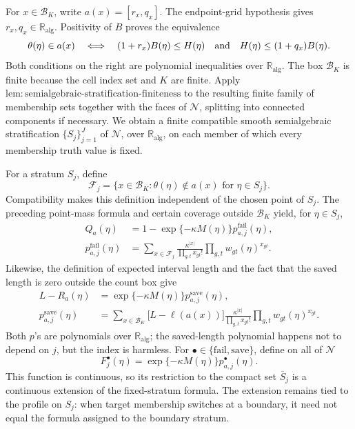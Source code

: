 For \(x\in\mathcal B_K\), write \(a(x)=[r_x,q_x]\).  The endpoint-grid hypothesis gives \(r_x,q_x\in\mathbb R_{\mathrm{alg}}\).  Positivity of \(B\) proves the equivalence
\[
 \theta(\eta)\in a(x)
 \quad\Longleftrightarrow\quad
 (1+r_x)B(\eta)\le H(\eta)
 \quad\hbox{and}\quad
 H(\eta)\le(1+q_x)B(\eta).
\]
Both conditions on the right are polynomial inequalities over \(\mathbb R_{\mathrm{alg}}\).  The box \(\mathcal B_K\) is finite because the cell index set and \(K\) are finite.  Apply \(\mathrm{lem{:}semialgebraic\text{-}stratification\text{-}finiteness}\) to the resulting finite family of membership sets together with the faces of \(\mathcal N\), splitting into connected components if necessary.  We obtain a finite compatible smooth semialgebraic stratification \(\{S_j\}_{j=1}^J\) of \(\mathcal N\), over \(\mathbb R_{\mathrm{alg}}\), on each member of which every membership truth value is fixed.

For a stratum \(S_j\), define
\[
 \mathcal F_j=\{x\in\mathcal B_K:
       \theta(\eta)\notin a(x)\text{ for }\eta\in S_j\}.
\]
Compatibility makes this definition independent of the chosen point of \(S_j\).  The preceding point-mass formula and certain coverage outside \(\mathcal B_K\) yield, for \(\eta\in S_j\),
\[
\begin{aligned}
Q_a(\eta)
 &=1-\exp\{-\kappa M(\eta)\}p^{\mathrm{fail}}_{a,j}(\eta),\\
p^{\mathrm{fail}}_{a,j}(\eta)
 &=\sum_{x\in\mathcal F_j}
   \frac{\kappa^{|x|}}{\prod_{g,t}x_{gt}!}
   \prod_{g,t}w_{gt}(\eta)^{x_{gt}}.
\end{aligned}
\]
Likewise, the definition of expected interval length and the fact that the saved length is zero outside the count box give
\[
\begin{aligned}
L-R_a(\eta)
 &=\exp\{-\kappa M(\eta)\}p^{\mathrm{save}}_{a,j}(\eta),\\
p^{\mathrm{save}}_{a,j}(\eta)
 &=\sum_{x\in\mathcal B_K}
   \bigl[L-\ell(a(x))\bigr]
   \frac{\kappa^{|x|}}{\prod_{g,t}x_{gt}!}
   \prod_{g,t}w_{gt}(\eta)^{x_{gt}}.
\end{aligned}
\]
Both \(p\)'s are polynomials over \(\mathbb R_{\mathrm{alg}}\); the saved-length polynomial happens not to depend on \(j\), but the index is harmless.  For \(\bullet\in\{\mathrm{fail},\mathrm{save}\}\), define on all of \(\mathcal N\)
\[
 F_j^{\bullet}(\eta)
 =\exp\{-\kappa M(\eta)\}p^{\bullet}_{a,j}(\eta).
\]
This function is continuous, so its restriction to the compact set \(\overline S_j\) is a continuous extension of the fixed-stratum formula.  The extension remains tied to the profile on \(S_j\): when target membership switches at a boundary, it need not equal the formula assigned to the boundary stratum.

